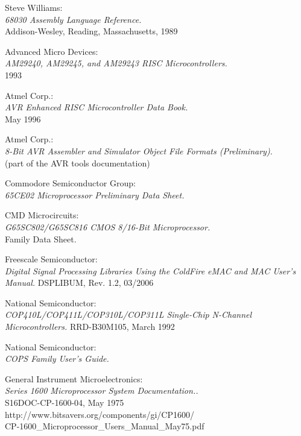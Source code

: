  Steve Williams: \\
                   {\em 68030 Assembly Language Reference.\/} \\
		   Addison-Wesley, Reading, Massachusetts, 1989

 Advanced Micro Devices: \\
		 {\em AM29240, AM29245, and AM29243 RISC
                  Microcontrollers.\/} \\
		 1993

 Atmel Corp.: \\
                {\em AVR Enhanced RISC Microcontroller Data Book.\/} \\ 
                May 1996

 Atmel Corp.: \\
                 {\em 8-Bit AVR Assembler and Simulator Object File
                  Formats (Preliminary).\/} \\
                 (part of the AVR tools documentation)

 Commodore Semiconductor Group: \\
                    {\em 65CE02 Microprocessor Preliminary Data Sheet.}

 CMD Microcircuits: \\
                {\em G65SC802/G65SC816 CMOS 8/16-Bit Microprocessor.\/} \\
		Family Data Sheet.

 Freescale Semiconductor: \\
               {\em Digital Signal Processing Libraries Using the ColdFire
                eMAC and MAC User's Manual.\/}
               DSPLIBUM, Rev. 1.2, 03/2006

 National Semiconductor: \\
               {\em COP410L/COP411L/COP310L/COP311L
               Single-Chip N-Channel Microcontrollers.\/}
               RRD-B30M105, March 1992

 National Semiconductor: \\
               {\em COPS Family User's Guide.\/}                               

 General Instrument Microelectronics: \\
                 {\em Series 1600 Microprocessor System Documentation..\/} \\
                 S16DOC-CP-1600-04, May 1975 \\
                 http://www.bitsavers.org/components/gi/CP1600/ \\
                 CP-1600\_Microprocessor\_Users\_Manual\_May75.pdf

